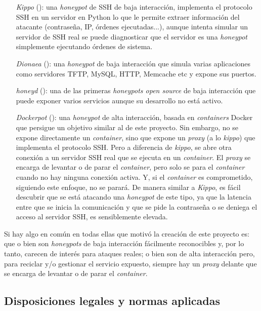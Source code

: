 \begin{enumerate}
    \item[\emph{Kippo}] (\cite{honeynet-kippo}): una \emph{honeypot} de SSH de baja interacción, implementa el protocolo SSH en un servidor en Python
    lo que le permite extraer información del atacante (contraseña, IP, órdenes ejecutadas...), aunque intenta simular un servidor de SSH real
    se puede diagnosticar que el servidor es una \emph{honeypot} simplemente ejecutando órdenes de sistema.
    \item[\emph{Dionaea}] (\cite{honeynet-dionaea}): una \emph{honeypot} de baja interacción que simula varias aplicaciones como servidores TFTP, MySQL, HTTP, Memcache etc y expone sus puertos.
    \item[\emph{honeyd}] (\cite{honeynet-lowinteraction}): una de las primeras \emph{honeypots open source} de baja interacción que puede exponer varios servicios aunque su desarrollo no está activo.
    \item[\emph{Dockerpot}] (\cite{honeynet-dockpot}): una \emph{honeypot} de alta interacción, basada en \emph{containers} Docker que persigue un objetivo similar al de este proyecto.
    Sin embargo, no se expone directamente un \emph{container}, sino que expone un \emph{proxy} (a lo \emph{kippo}) que implementa el protocolo SSH. Pero a diferencia de \emph{kippo}, se abre otra conexión
    a un servidor SSH real que se ejecuta en un \emph{container}. El \emph{proxy} se encarga de levantar o de parar el \emph{container}, pero solo se para el \emph{container} cuando no hay ninguna conexión activa. Y, si el \emph{container} es comprometido, siguiendo este enfoque, no se parará.
    De manera similar a \emph{Kippo}, es fácil descubrir  que se está atacando una \emph{honeypot} de este tipo, ya que la latencia entre que se inicia la comunicación
    y que se pide la contraseña o se deniega el acceso al servidor SSH, es sensiblemente elevada.
\end{enumerate}

Si hay algo en común en todas ellas que motivó la creación de este proyecto es: que o bien son \emph{honeypots} de baja interacción fácilmente reconocibles
y, por lo tanto, carecen de interés para ataques reales; o bien son de alta interacción pero, para reciclar y/o gestionar el servicio expuesto, siempre hay un \emph{proxy} delante
que se encarga de levantar o de parar el \emph{container}.

\nocite{*}
\nopagebreak
\printbibheading[title={Normas y referencias},heading=subbibnumbered]
\subsection{Disposiciones legales y normas aplicadas}
